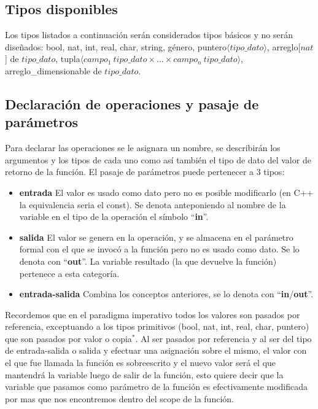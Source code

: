 \subsection{Tipos disponibles}

Los tipos listados a continuaci\'on ser\'an considerados tipos b\'asicos y no ser\'an dise\~nados: bool, nat, int, real, char, string, g\'enero, puntero$\langle tipo\_dato \rangle$, arreglo[$nat$] de $tipo\_dato$, tupla$\langle campo_1\:tipo\_dato \times ... \times campo_n\:tipo\_dato \rangle$, arreglo\_dimensionable de $tipo\_dato$.

\subsection{Declaraci\'on de operaciones y pasaje de par\'ametros}

Para declarar las operaciones se le asignara un nombre, se describir\'an los argumentos y los tipos de cada uno como as\'i tambi\'en el tipo de dato del valor de retorno de la funci\'on. El pasaje de par\'ametros puede pertenecer a 3 tipos:

\begin{itemize}
 \item \textbf{entrada} El valor es usado como dato pero no es posible modificarlo (en C++ la equivalencia seria el const). Se denota anteponiendo al nombre de la variable en el tipo de la operaci\'on el s\'imbolo ``\textbf{in}''.
 \item \textbf{salida} El valor se genera en la operaci\'on, y se almacena en el par\'ametro formal con el que se invoc\'o a la funci\'on pero no es usado como dato. Se lo denota con ``\textbf{out}''. La variable resultado (la que devuelve la funci\'on) pertenece a esta categor\'ia.
 \item \textbf{entrada-salida} Combina los conceptos anteriores, se lo denota con ``\textbf{in}/\textbf{out}''.
\end{itemize}

Recordemos que en el paradigma imperativo todos los valores son pasados por referencia, exceptuando a los tipos primitivos (bool, nat, int, real, char, puntero) que son pasados por valor o copia$^*$. Al ser pasados por referencia y al ser del tipo de entrada-salida o salida y efectuar una asignaci\'on sobre el mismo, el valor con el que fue llamada la funci\'on es sobreescrito y el nuevo valor ser\'a el que mantendr\'a la variable luego de salir de la funci\'on, esto quiere decir que la variable que pasamos como par\'ametro de la funci\'on es efectivamente modificada por mas que nos encontremos dentro del scope de la funci\'on.

